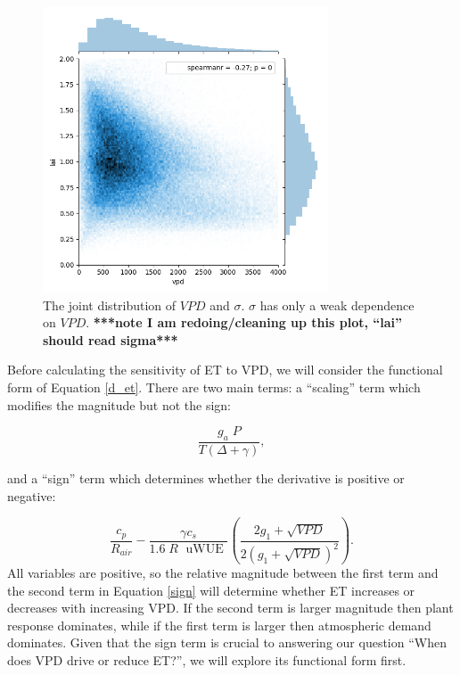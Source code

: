 \documentclass[draft,linenumbers]{agujournal}
\begin{document}
\begin{figure}[h]
\centering
\includegraphics[width=20pc]{./fig03.png}
\caption{The joint distribution of $VPD$ and $\sigma$. $\sigma$ has only a weak dependence on $VPD$. \textbf{***note I am redoing/cleaning up this plot, ``lai'' should read sigma***}}
\label{lai_vpd_fig}
\end{figure}

Before calculating the sensitivity of ET to VPD, we will consider the functional form of Equation \ref{d_et}. There are two main terms: a ``scaling'' term which modifies the magnitude but not the sign:

\begin{equation}
  \frac{g_a \; P}{T(\Delta + \gamma)},
\end{equation}

and a ``sign'' term which determines whether the derivative is positive or negative:

\begin{equation}
  \label{sign}
  \frac{c_p}{R_{air}} - \frac{\gamma c_s }{1.6 \; R\; \text{ uWUE }} \left( \frac{2 g_1 + \sqrt{VPD}}{2 (g_1 + \sqrt{VPD})^2}\right).
\end{equation}
All variables are positive, so the relative magnitude between the first term and the second term in Equation \ref{sign} will determine whether ET increases or decreases with increasing VPD. If the second term is larger magnitude then plant response dominates, while if the first term is larger then atmospheric demand dominates. Given that the sign term is crucial to answering our question ``When does VPD drive or reduce ET?'', we will explore its functional form first.
\end{document}
